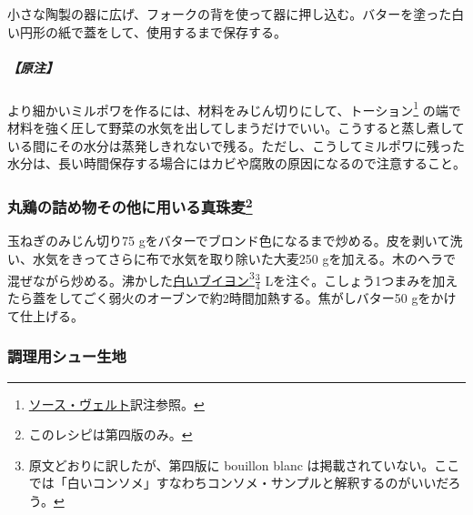 \begin{recette}
小さな陶製の器に広げ、フォークの背を使って器に押し込む。バターを塗った白い円形の紙で蓋をして、使用するまで保存する。

\hypertarget{ux539fux6ce8-1}{%
\subparagraph{【原注】}\label{ux539fux6ce8-1}}

より細かいミルポワを作るには、材料をみじん切りにして、トーション\footnote{\protect\hyperlink{sauce-verte}{ソース・ヴェルト}訳注参照。}
の端で材料を強く圧して野菜の水気を出してしまうだけでいい。こうすると蒸し煮している間にその水分は蒸発しきれないで残る。ただし、こうしてミルポワに残った水分は、長い時間保存する場合にはカビや腐敗の原因になるので注意すること。

\hypertarget{orge-perle-pour-volailles-farcies}{%
\subsubsection[丸鶏の詰め物その他に用いる真珠麦]{\texorpdfstring{丸鶏の詰め物その他に用いる真珠麦\footnote{このレシピは第四版のみ。}}{丸鶏の詰め物その他に用いる真珠麦}}\label{orge-perle-pour-volailles-farcies}}



玉ねぎのみじん切り75
gをバターでブロンド色になるまで炒める。皮を剥いて洗い、水気をきってさらに布で水気を取り除いた大麦250
gを加える。木のヘラで混ぜながら炒める。沸かした\protect\hyperlink{consomme-blanc}{白いブイヨン}\footnote{原文どおりに訳したが、第四版に
  bouillon blanc
  は掲載されていない。ここでは「白いコンソメ」すなわちコンソメ・サンプルと解釈するのがいいだろう。}\(\frac{3}{4}\)
Lを注ぐ。こしょう1つまみを加えたら蓋をしてごく弱火のオーブンで約2時間加熱する。焦がしバター50
gをかけて仕上げる。

\hypertarget{pate-a-chou-d-office}{%
\subsubsection{調理用シュー生地}\label{pate-a-chou-d-office}}


\end{recette}
